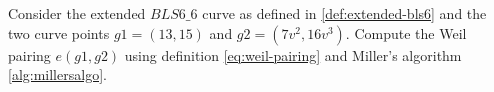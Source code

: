 \begin{exercise}
\label{ex:generator-pairing}
Consider the extended $BLS6\_6$ curve as defined in \ref{def:extended-bls6} and the two curve points $g1=(13,15)$ and $g2=(7v^2,16v^3)$. Compute the Weil pairing 
$e(g1,g2)$ using definition \ref{eq:weil-pairing} and Miller's algorithm \ref{alg:millersalgo}.
\end{exercise}
\begin{comment}
\subsection{Hashing to pairing groups}
We give various constructions to hash into $\mathbb{G}_1$ and $\mathbb{G}_2$. 

We start with hashing to the scalar field... \smelong{TO APPEAR}\sme{finish writing this up}

None of these techniques work for hashing into $\mathbb{G}_2$. We therefore implement Pederson's Hash for BLS6. 

We start with $\mathbb{G}_1$. Our goal is to define an $12$-bit bounded hash function:
$$
H_{1}: \{0,1\}^{12} \to \mathbb{G}_1 
$$
Since $12= 3\cdot 4$ we ``randomly'' select $4$ uniformly distributed generators $\{(38, 15), (35,28),\\ (27, 34), (38, 28)\}$ from $\mathbb{G}_1$ and use the pseudo-random function from XXX\sme{add reference}. 
Therefore, we have to choose a set of $4$ randomly generated invertible elements from $\F_{13}$ for every generator. We choose the following:
$$
\begin{array}{lcl}
(38,15) &:& \{2,7,5,9\}\\
(35,28) &:& \{11,4,7,7\}\\
(27,34) &:& \{5,3,7,12\}\\
(38,28) &:& \{6,5,1,8\}
\end{array}
$$
Our hash function is then computed as follows:

\begin{multline*}
H_1(x_{11},x_1,\ldots, x_{0})=
[2\cdot 7^{x_{11}}\cdot 5^{x_{10}}\cdot 9^{x_9}](38,15)+
[11\cdot 4^{x_8}\cdot 7^{x_7}\cdot 7^{x_6}](35,28)+\\
[5\cdot 3^{x_5}\cdot 7^{x_4}\cdot 12^{x_3}](27,34) +
[6\cdot 5^{x_2}\cdot 1^{x_{1}}\cdot 8^{x_{0}}](38,28)
\end{multline*}

Note that $a^x=1$ when $x=0$. Hence, those terms can be omitted in the computation. 
In particular, the hash of the $12$-bit zero string is given as follows:\sme{correct computations}


\end{comment}
